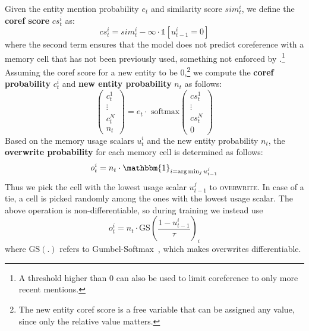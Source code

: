 \documentclass[11pt,a4paper]{article}
\newcommand{\actoverwrite}{\textsc{overwrite}\xspace}
\newcommand{\mysim}{\mathit{sim}}
\newcommand{\cs}{\mathit{cs}}
\begin{document}
Given the entity mention probability $e_t$ and similarity score $\mysim_{t}^{i}$, we define the \textbf{coref score} $\cs_{t}^{i}$ as:
\begin{equation} \label{coref_score_eqn}
\cs_{t}^{i} = \mysim_{t}^{i} - \infty \cdot \mathds{1} [u^i_{t-1} = 0]
\end{equation}
where the second term ensures that the model does not predict coreference with a memory cell that has not been previously used, something not enforced by \citet{liu2019referential}.\footnote{A threshold higher than 0 can also be used to limit coreference to only more recent mentions.} Assuming the coref score for a new entity to be 0,\footnote{The new entity coref score is a free variable that can be assigned any value, since only the relative value matters.} we compute the \textbf{coref probability} $c_{t}^{i}$ and \textbf{new entity probability} $n_t$ as follows:
\begin{equation}
\label{coref_over_eqn}
          \begin{pmatrix}
           c_t^1 \\
           \vdots \\
           c_t^N \\
           n_t
          \end{pmatrix} = e_t \cdot \text{ softmax}
          \begin{pmatrix}
           \cs_{t}^{1} \\
           \vdots \\
           \cs_{t}^{N} \\
           0
         \end{pmatrix}
\end{equation}
Based on the memory usage scalars $u^i_t$ and the new entity probability $n_t$, the \textbf{overwrite probability} for each memory cell is determined as follows:
\begin{equation}\label{over_eqn_inf}
o_t^{i} = n_t \cdot \mathbbm{1}_{i = \arg\min_j u^j_{t-1}}
\end{equation}
Thus we pick the cell with the lowest usage scalar $u^j_{t-1}$ to \actoverwrite. In case of a tie, a cell is picked randomly among the ones with the lowest usage scalar.
The above operation is non-differentiable,
so during training we instead use \begin{equation}\label{over_eqn_train}
o_t^{i} = n_t \cdot \text{GS}\left(\frac{1 - u_{t-1}^{i}}{\tau}\right)_i
\end{equation}
where $\text{GS}(.)$ refers to Gumbel-Softmax~\cite{jang2017categorical}, which makes overwrites differentiable. 
\end{document}
